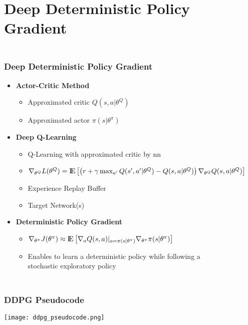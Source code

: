\documentclass[accentcolor=tud1d,colorbacktitle,inverttitle,landscape,german,presentation,t]{tudbeamer}
\begin{document}
\section{Deep Deterministic Policy Gradient}
	\begin{frame}
		\frametitle{\\Deep Deterministic Policy Gradient}
		\begin{itemize}
			\item \textbf{Actor-Critic Method}
			\begin{itemize}
				\item Approximated critic $Q(s,a|\theta^Q)$
				\item Approximated actor $\pi(s|\theta^\pi)$
			\end{itemize}
			\vspace{2mm}
			\item \textbf{Deep Q-Learning}
			\begin{itemize}
				\item Q-Learning with approximated critic by nn
				\item $\nabla_{\theta^Q}L(\theta^Q)={\rm I\!E} \left[\left(r+\gamma \max_{a'} Q(s', 
				a'|\theta^Q)-Q(s,a|\theta^Q)\right)\nabla_{\theta^Q}Q(s,a|\theta^Q)\right] $
				\item Experience Replay Buffer
				\item Target Network(s)
			\end{itemize}
			\vspace{2mm}
			\item \textbf{Deterministic Policy Gradient}
			\begin{itemize}
				\item $\nabla_{\theta^\pi}J(\theta^\pi)\approx {\rm I\!E}\left[\nabla_aQ(s,a)|_{a=\pi(s|\theta^\pi)} \nabla_{\theta^\pi}\pi(s|\theta^\pi)\right]$
				\item Enables to learn a deterministic policy while following a \\stochastic exploratory policy
			\end{itemize}
		\end{itemize}
	\end{frame}
	\begin{frame}
		\frametitle{\\DDPG Pseudocode}
		\texttt{[image: ddpg\_pseudocode.png]}
	\end{frame}
\end{document}
